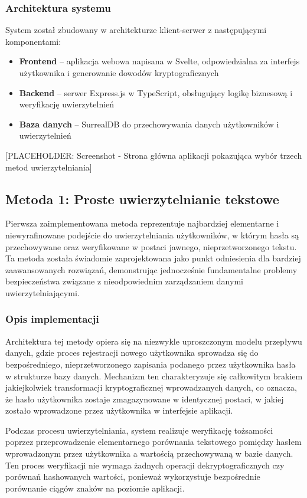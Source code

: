 \documentclass{article}
\begin{document}
\subsubsection{Architektura systemu}
System został zbudowany w architekturze klient-serwer z następującymi komponentami:
\begin{itemize}
    \item \textbf{Frontend} – aplikacja webowa napisana w Svelte, odpowiedzialna za interfejs użytkownika i generowanie dowodów kryptograficznych
    \item \textbf{Backend} – serwer Express.js w TypeScript, obsługujący logikę biznesową i weryfikację uwierzytelnień
    \item \textbf{Baza danych} – SurrealDB do przechowywania danych użytkowników i uwierzytelnień
\end{itemize}

[PLACEHOLDER: Screenshot - Strona główna aplikacji pokazująca wybór trzech metod uwierzytelniania]

\subsection{Metoda 1: Proste uwierzytelnianie tekstowe}

Pierwsza zaimplementowana metoda reprezentuje najbardziej elementarne i niewyrafinowane podejście do uwierzytelniania użytkowników, w którym hasła są przechowywane oraz weryfikowane w postaci jawnego, nieprzetworzonego tekstu. Ta metoda została świadomie zaprojektowana jako punkt odniesienia dla bardziej zaawansowanych rozwiązań, demonstrując jednocześnie fundamentalne problemy bezpieczeństwa związane z nieodpowiednim zarządzaniem danymi uwierzytelniającymi.

\subsubsection{Opis implementacji}
Architektura tej metody opiera się na niezwykle uproszczonym modelu przepływu danych, gdzie proces rejestracji nowego użytkownika sprowadza się do bezpośredniego, nieprzetworzonego zapisania podanego przez użytkownika hasła w strukturze bazy danych. Mechanizm ten charakteryzuje się całkowitym brakiem jakiejkolwiek transformacji kryptograficznej wprowadzanych danych, co oznacza, że hasło użytkownika zostaje zmagazynowane w identycznej postaci, w jakiej zostało wprowadzone przez użytkownika w interfejsie aplikacji.

Podczas procesu uwierzytelniania, system realizuje weryfikację tożsamości poprzez przeprowadzenie elementarnego porównania tekstowego pomiędzy hasłem wprowadzonym przez użytkownika a wartością przechowywaną w bazie danych. Ten proces weryfikacji nie wymaga żadnych operacji dekryptograficznych czy porównań hashowanych wartości, ponieważ wykorzystuje bezpośrednie porównanie ciągów znaków na poziomie aplikacji.
\end{document}
